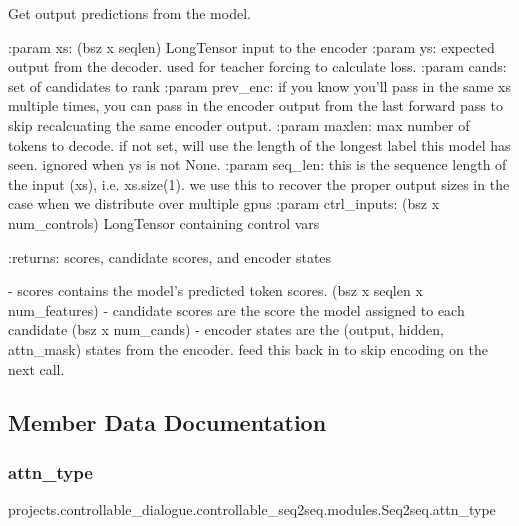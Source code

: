 \begin{DoxyVerb}Get output predictions from the model.

:param xs:
    (bsz x seqlen) LongTensor input to the encoder
:param ys:
    expected output from the decoder. used for teacher forcing
    to calculate loss.
:param cands:
    set of candidates to rank
:param prev_enc:
    if you know you'll pass in the same xs multiple times, you can pass
    in the encoder output from the last forward pass to skip
    recalcuating the same encoder output.
:param maxlen:
    max number of tokens to decode. if not set, will use the length of
    the longest label this model has seen. ignored when ys is not None.
:param seq_len:
    this is the sequence length of the input (xs), i.e. xs.size(1). we
    use this to recover the proper output sizes in the case when we
    distribute over multiple gpus
:param ctrl_inputs:
    (bsz x num_controls) LongTensor containing control vars

:returns:
    scores, candidate scores, and encoder states

    - scores contains the model's predicted token scores.
      (bsz x seqlen x num_features)
    - candidate scores are the score the model assigned to each candidate
      (bsz x num_cands)
    - encoder states are the (output, hidden, attn_mask) states from the
      encoder. feed this back in to skip encoding on the next call.
\end{DoxyVerb}
 

\subsection{Member Data Documentation}
\mbox{\label{classprojects_1_1controllable__dialogue_1_1controllable__seq2seq_1_1modules_1_1Seq2seq_a4833c08e2b56ae9b0d3f331967b01187}} 
\subsubsection{\texorpdfstring{attn\+\_\+type}{attn\_type}}
{\footnotesize\ttfamily projects.\+controllable\+\_\+dialogue.\+controllable\+\_\+seq2seq.\+modules.\+Seq2seq.\+attn\+\_\+type}

